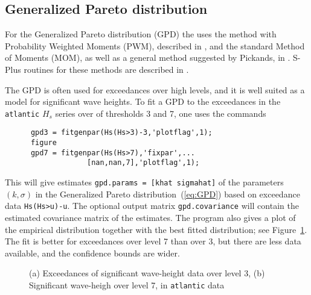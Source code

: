 \subsection{Generalized Pareto distribution}

For the Generalized Pareto distribution (GPD) the \progname{} uses
the method with Probability Weighted Moments (PWM), described in
\cite{HoskingAndWallis1987Parameter}, and the standard Method of
Moments (MOM), as well as a
general method suggested by Pickands, in
\cite{Pickands1975Statistical}. S-Plus routines
for these methods are described in \cite{Borg1992XS}.

The GPD is often used for exceedances over high levels, and it is
well suited as a model for significant wave heights.
To fit a GPD to the exceedances in the {\tt atlantic}
$H_s$ series over of thresholds 3 and 7, one uses the commands
{\small\begin{verbatim}
      gpd3 = fitgenpar(Hs(Hs>3)-3,'plotflag',1);
      figure
      gpd7 = fitgenpar(Hs(Hs>7),'fixpar',...
                   [nan,nan,7],'plotflag',1);
\end{verbatim}}
\noindent
This will give estimates {\tt gpd.params = [khat sigmahat]} of the parameters $(k,
{\sigma})$ in the Generalized Pareto distribution~(\ref{eq:GPD}) based on
exceedance data
{\tt Hs(Hs>u)-u}. The optional output matrix {\tt gpd.covariance} will contain the
estimated covariance matrix of the estimates.
The program also gives a plot of the empirical
distribution together with the best fitted distribution; see
Figure~\ref{fig7-3}. The fit is better for exceedances over level
7 than over 3, but there are less data available, and the confidence bounds are wider.

\begin{figure}
%
\hfill
{}
\vspace{-4mm}
  \caption[Exceedances of significant wave-height data over levels]
{(a) Exceedances of significant wave-height data over level 3,
  (b) Significant wave-heigh over level 7, in {\tt atlantic} data}
  \label{fig7-3}
\end{figure}

